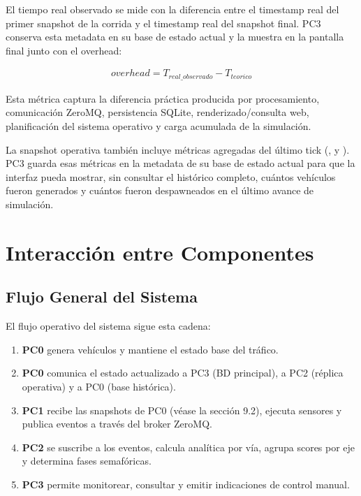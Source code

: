 \documentclass[12pt, a4paper]{article}
\let\oldtexttt\texttt
\renewcommand{\texttt}[1]{\oldtexttt{\seqsplit{#1}}}
\begin{document}
El tiempo real observado se mide con la diferencia entre el timestamp real del primer snapshot de la corrida y el timestamp real del snapshot final. PC3 conserva esta metadata en su base de estado actual y la muestra en la pantalla final junto con el overhead:

\begin{align}
overhead = T_{real\_observado} - T_{teorico}
\end{align}

Esta métrica captura la diferencia práctica producida por procesamiento, comunicación ZeroMQ, persistencia SQLite, renderizado/consulta web, planificación del sistema operativo y carga acumulada de la simulación.

La snapshot operativa también incluye métricas agregadas del último tick (\texttt{creados}, \texttt{eliminados} y \texttt{movidos}). PC3 guarda esas métricas en la metadata de su base de estado actual para que la interfaz pueda mostrar, sin consultar el histórico completo, cuántos vehículos fueron generados y cuántos fueron despawneados en el último avance de simulación.

\section{Interacción entre Componentes}

\subsection{Flujo General del Sistema}

El flujo operativo del sistema sigue esta cadena:

\begin{enumerate}
    \item \textbf{PC0} genera vehículos y mantiene el estado base del tráfico.
    \item \textbf{PC0} comunica el estado actualizado a PC3 (BD principal), a PC2 (réplica operativa) y a PC0 (base histórica).
    \item \textbf{PC1} recibe las snapshots de PC0 (véase la sección 9.2), ejecuta sensores y publica eventos a través del broker ZeroMQ.
    \item \textbf{PC2} se suscribe a los eventos, calcula analítica por vía, agrupa scores por eje y determina fases semafóricas.
    \item \textbf{PC3} permite monitorear, consultar y emitir indicaciones de control manual.
\end{enumerate}
\end{document}
